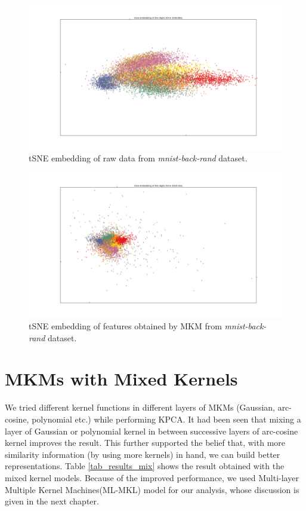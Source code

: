 \begin{figure}
  \centering
  \captionsetup{justification=centering,margin=0.1cm}
  \includegraphics[scale=0.45]{figures/tsne_rand_rawdata}
  \caption{tSNE embedding of raw data from \textit{mnist-back-rand} dataset.}
  \label{tsne_rand_raw}
\end{figure}


\begin{figure}
  \centering
  \captionsetup{justification=centering,margin=0.1cm}
  \includegraphics[scale=0.45]{figures/tsne_rand_mkmbest}
  \caption{tSNE embedding of features obtained by MKM from \textit{mnist-back-rand} dataset.}
  \label{tsne_rand_mkm}
\end{figure}



\section{MKMs with Mixed Kernels}
\label{chap2_mkm_mix}
We tried different kernel functions in different layers of MKMs (Gaussian, arc-cosine, polynomial etc.) while performing KPCA. It had been seen that mixing a layer of Gaussian or polynomial kernel in between successive layers of arc-cosine kernel improves the result. This further supported the belief that, with more similarity information (by using more kernels) in hand, we can build better representations. Table \ref{tab_results_mix} shows the result obtained with the mixed kernel models. Because of the improved performance, we used  Multi-layer Multiple Kernel Machines(ML-MKL) model for our analysis, whose  discussion is given in the next chapter.

